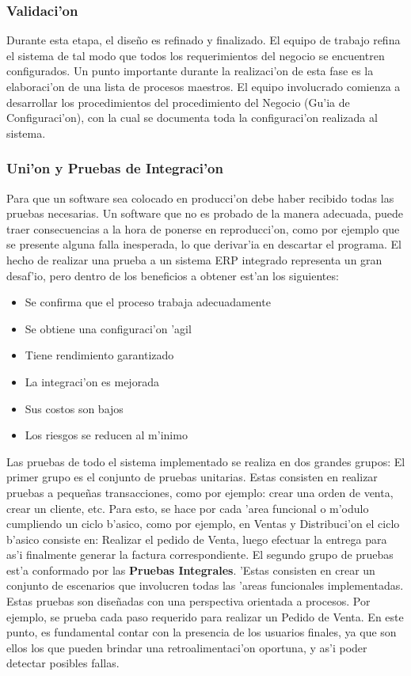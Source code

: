 \subsubsection{Validaci'on}
	Durante esta etapa, el dise\~no es refinado y finalizado. El equipo de trabajo refina el sistema de tal modo que todos los requerimientos del negocio se encuentren configurados. 
	Un punto importante durante la realizaci'on de esta fase es la elaboraci'on de una lista de procesos maestros. 	El equipo involucrado comienza a desarrollar los procedimientos del procedimiento del Negocio (Gu'ia de Configuraci'on), con la cual se documenta toda la configuraci'on realizada al sistema. 
\subsubsection{Uni'on y Pruebas de Integraci'on}
	Para que un software sea colocado en producci'on debe haber recibido todas las pruebas necesarias. Un software que no es probado de la manera adecuada, puede traer consecuencias a la hora de ponerse en reproducci'on, como por ejemplo que se presente alguna falla inesperada, lo que derivar'ia en descartar el programa.
	El hecho de realizar una prueba a un sistema ERP integrado representa un gran desaf'io, pero dentro de los beneficios a obtener est'an los siguientes: 
\begin{itemize}
\item Se confirma que el proceso trabaja adecuadamente
\item Se obtiene una configuraci'on 'agil
\item Tiene rendimiento garantizado
\item La integraci'on es mejorada
\item Sus costos son bajos
\item Los riesgos se reducen al m'inimo
\end{itemize}
Las pruebas de todo el sistema implementado se realiza en dos grandes grupos: El primer grupo es el conjunto de pruebas unitarias. Estas consisten en realizar pruebas a peque\~nas transacciones, como por ejemplo: crear una orden de venta, crear un cliente, etc. Para esto, se hace por cada 'area funcional o m'odulo cumpliendo un ciclo b'asico, como por ejemplo, en Ventas y Distribuci'on el ciclo b'asico consiste en: Realizar el pedido de Venta, luego efectuar la entrega para as'i finalmente generar la factura correspondiente. 
El segundo grupo de pruebas est'a conformado por las \textbf{Pruebas Integrales}. 'Estas consisten en crear un conjunto de escenarios que involucren todas las 'areas funcionales implementadas. Estas pruebas son dise\~nadas con una perspectiva orientada a procesos. Por ejemplo, se prueba cada paso requerido para realizar un Pedido de Venta. En este punto, es fundamental contar con la presencia de los usuarios finales, ya que son ellos los que pueden brindar una retroalimentaci'on oportuna, y as'i poder detectar posibles fallas.
